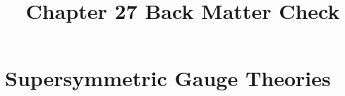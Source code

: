 \documentclass[11pt,a4paper]{article}
\title{Chapter 27 Back Matter Check}
\author{}
\numberwithin{equation}{subsection}
\begin{document}
\maketitle
\setcounter{section}{26}
\section{Supersymmetric Gauge Theories}

\end{document}
